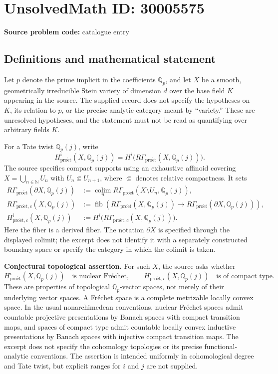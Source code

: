 \documentclass[11pt]{article}
\newcommand{\N}{\mathbb{N}}
\newcommand{\Q}{\mathbb{Q}}
\begin{document}
\section*{UnsolvedMath ID: 30005575}
\textbf{Source problem code:} catalogue entry
\subsection{Definitions and mathematical statement}
Let \(p\) denote the prime implicit in the coefficients \(\Q_p\), and let \(X\) be a smooth, geometrically irreducible Stein variety of dimension \(d\) over the base field \(K\) appearing in the source. The supplied record does not specify the hypotheses on \(K\), its relation to \(p\), or the precise analytic category meant by ``variety.'' These are unresolved hypotheses, and the statement must not be read as quantifying over arbitrary fields \(K\).

For a Tate twist \(\Q_p(j)\), write
\[
H^i_{\mathrm{pro\acute et}}(X,\Q_p(j))
=H^i\bigl(R\Gamma_{\mathrm{pro\acute et}}(X,\Q_p(j))\bigr).
\]
The source specifies compact supports using an exhaustive affinoid covering \(X=\bigcup_{n\in\N}U_n\) with \(U_n\Subset U_{n+1}\), where \(\Subset\) denotes relative compactness. It sets
\[
\begin{aligned}
R\Gamma_{\mathrm{pro\acute et}}(\partial X,\Q_p(j))
&:=\operatorname*{colim}_{n}R\Gamma_{\mathrm{pro\acute et}}(X\setminus U_n,\Q_p(j)),\\
R\Gamma_{\mathrm{pro\acute et},c}(X,\Q_p(j))
&:=\operatorname{fib}\!\left(
R\Gamma_{\mathrm{pro\acute et}}(X,\Q_p(j))
\longrightarrow R\Gamma_{\mathrm{pro\acute et}}(\partial X,\Q_p(j))
\right),\\
H^i_{\mathrm{pro\acute et},c}(X,\Q_p(j))
&:=H^i\bigl(R\Gamma_{\mathrm{pro\acute et},c}(X,\Q_p(j))\bigr).
\end{aligned}
\]
Here the fiber is a derived fiber. The notation \(\partial X\) is specified through the displayed colimit; the excerpt does not identify it with a separately constructed boundary space or specify the category in which the colimit is taken.

\textbf{Conjectural topological assertion.} For such \(X\), the source asks whether
\[
H^i_{\mathrm{pro\acute et}}(X,\Q_p(j))
\quad\text{is nuclear Fr\'echet},\qquad
H^i_{\mathrm{pro\acute et},c}(X,\Q_p(j))
\quad\text{is of compact type}.
\]
These are properties of topological \(\Q_p\)-vector spaces, not merely of their underlying vector spaces. A Fr\'echet space is a complete metrizable locally convex space. In the usual nonarchimedean conventions, nuclear Fr\'echet spaces admit countable projective presentations by Banach spaces with compact transition maps, and spaces of compact type admit countable locally convex inductive presentations by Banach spaces with injective compact transition maps. The excerpt does not specify the cohomology topologies or its precise functional-analytic conventions. The assertion is intended uniformly in cohomological degree and Tate twist, but explicit ranges for \(i\) and \(j\) are not supplied.
\end{document}
